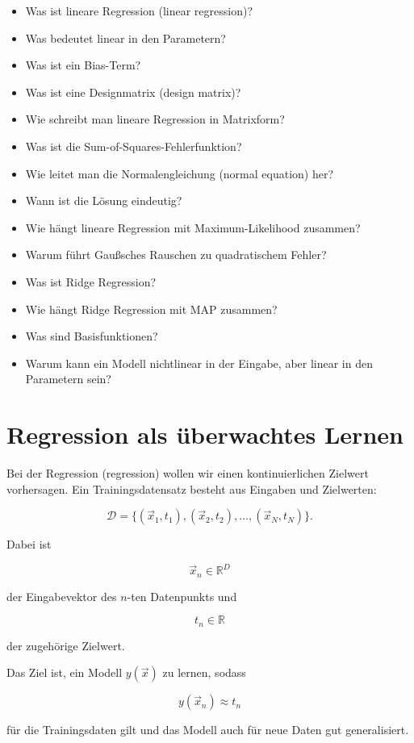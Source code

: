 \begin{itemize}
    \item Was ist lineare Regression (linear regression)?
    \item Was bedeutet linear in den Parametern?
    \item Was ist ein Bias-Term?
    \item Was ist eine Designmatrix (design matrix)?
    \item Wie schreibt man lineare Regression in Matrixform?
    \item Was ist die Sum-of-Squares-Fehlerfunktion?
    \item Wie leitet man die Normalengleichung (normal equation) her?
    \item Wann ist die Lösung eindeutig?
    \item Wie hängt lineare Regression mit Maximum-Likelihood zusammen?
    \item Warum führt Gaußsches Rauschen zu quadratischem Fehler?
    \item Was ist Ridge Regression?
    \item Wie hängt Ridge Regression mit MAP zusammen?
    \item Was sind Basisfunktionen?
    \item Warum kann ein Modell nichtlinear in der Eingabe, aber linear in den Parametern sein?
\end{itemize}

\section{Regression als überwachtes Lernen}

Bei der Regression (regression) wollen wir einen kontinuierlichen Zielwert vorhersagen.
Ein Trainingsdatensatz besteht aus Eingaben und Zielwerten:

\[
    \mathcal{D}
    =
    \{(\vec{x}_1,t_1),(\vec{x}_2,t_2),\dots,(\vec{x}_N,t_N)\}.
\]

Dabei ist

\[
    \vec{x}_n \in \mathbb{R}^D
\]

der Eingabevektor des \(n\)-ten Datenpunkts und

\[
    t_n \in \mathbb{R}
\]

der zugehörige Zielwert.

Das Ziel ist, ein Modell \(y(\vec{x})\) zu lernen, sodass

\[
    y(\vec{x}_n) \approx t_n
\]

für die Trainingsdaten gilt und das Modell auch für neue Daten gut generalisiert.

